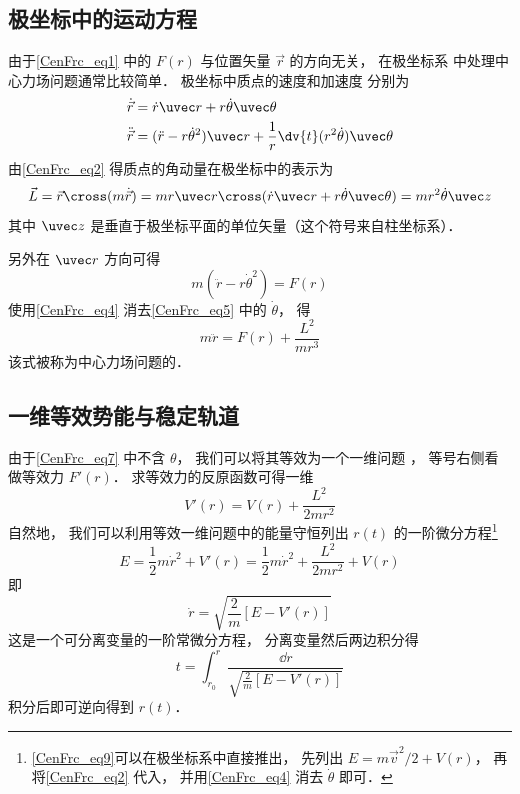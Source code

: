 \subsection{极坐标中的运动方程}
由于\autoref{CenFrc_eq1} 中的 $F(r)$ 与位置矢量 $\vec r$ 的方向无关， 在极坐标系 中处理中心力场问题通常比较简单． 极坐标中质点的速度和加速度 分别为
\begin{align}
\dot{\vec r} &= \dot r \uvec r + r\dot\theta\uvec\theta\label{CenFrc_eq2}\\
\ddot{\vec r} &= (\ddot{r} - r \dot\theta^2)\uvec r + \frac 1r \dv{t} (r^2\dot\theta)\uvec \theta\label{CenFrc_eq3}
\end{align}
由\autoref{CenFrc_eq2} 得质点的角动量在极坐标中的表示为
\begin{equation}\label{CenFrc_eq4}
\vec L = \vec r \cross (m \dot{\vec r})
= mr \uvec r \cross (\dot r \uvec r + r\dot\theta \uvec\theta)
= mr^2\dot \theta \uvec z
\end{equation}
其中 $\uvec z$ 是垂直于极坐标平面的单位矢量（这个符号来自柱坐标系）． 

另外在 $\uvec r$ 方向可得
\begin{equation}\label{CenFrc_eq5}
m(\ddot{r} - r \dot\theta^2) = F(r)
\end{equation}
使用\autoref{CenFrc_eq4} 消去\autoref{CenFrc_eq5} 中的 $\dot\theta$， 得
\begin{equation}\label{CenFrc_eq7}
m\ddot r = F(r) + \frac{L^2}{mr^3}
\end{equation}
该式被称为中心力场问题的．

\subsection{一维等效势能与稳定轨道}
由于\autoref{CenFrc_eq7} 中不含 $\theta$， 我们可以将其等效为一个一维问题%
， 等号右侧看做等效力 $F'(r)$． 求等效力的反原函数可得一维
\begin{equation}
V'(r) = V(r) + \frac{L^2}{2mr^2}
\end{equation}
自然地， 我们可以利用等效一维问题中的能量守恒列出 $r(t)$ 的一阶微分方程\footnote{\autoref{CenFrc_eq9}可以在极坐标系中直接推出， 先列出 $E = m\vec v^2/2 + V(r)$， 再将\autoref{CenFrc_eq2} 代入， 并用\autoref{CenFrc_eq4} 消去 $\dot\theta$ 即可．}
\begin{equation}\label{CenFrc_eq9}
E = \frac 12 m\dot r^2 + V'(r) = \frac 12 m\dot r^2 + \frac{L^2}{2mr^2} + V(r)
\end{equation}
即
\begin{equation}
\dot r = \sqrt{\frac 2m [E - V'(r)]}
\end{equation}
这是一个可分离变量的一阶常微分方程， %
分离变量然后两边积分得
\begin{equation}
t = \int_{r_0}^{r} \frac{\dd{r}}{\sqrt{\frac 2m [E - V'(r)]}}
\end{equation}
积分后即可逆向得到 $r(t)$．


